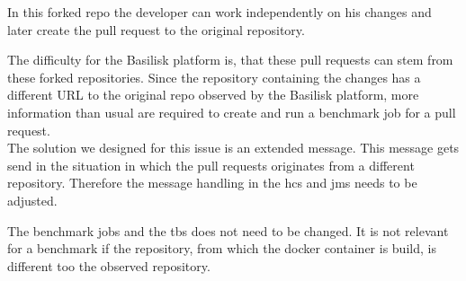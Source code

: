 In this forked repo the developer can work independently on his changes and later create the pull request to the original repository.

The difficulty for the Basilisk platform is, that these pull requests can stem from these forked repositories.
Since the repository containing the changes has a different URL to the original repo observed by the Basilisk platform, more information than usual are required to create and run a benchmark job for a pull request.
\\

The solution we designed for this issue is an extended message.
This message gets send in the situation in which the pull requests originates from a different repository.
Therefore the message handling in the \ac{hcs} and \ac{jms} needs to be adjusted.

The benchmark jobs and the \acl{tbs} does not need to be changed.
It is not relevant for a benchmark if the repository, from which the docker container is build, is different too the observed repository.


